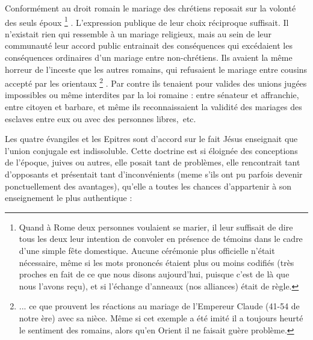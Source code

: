  Conformément au droit romain le mariage des chrétiens reposait sur la volonté des seuls époux
\footnote{Quand à Rome deux personnes voulaient se marier, il leur suffisait de dire tous les deux leur intention de convoler en présence de témoins dans le cadre d'une simple fête domestique. Aucune cérémonie plus officielle n'était nécessaire, même si les mots prononcés étaient plus ou moins codifiés (très proches en fait de ce que nous disons aujourd'hui, puisque c'est de là que nous l'avons reçu), et si l'échange d'anneaux (nos alliances) était de règle.}%
. L'expression publique de leur choix réciproque suffisait. Il n'existait rien qui ressemble à un mariage religieux, mais au sein de leur communauté leur accord public entrainait des conséquences qui excédaient les conséquences ordinaires d'un mariage entre non-chrétiens. Ils avaient la même horreur de l'inceste que les autres romains, qui refusaient le mariage entre cousins accepté par les orientaux
\footnote{... ce que prouvent les réactions au mariage de l'Empereur Claude (41-54 de notre ère) avec sa nièce. Même si cet exemple a été imité il a toujours heurté le sentiment des romains, alors qu'en Orient il ne faisait guère problème.}
. Par contre ils tenaient pour valides des unions jugées impossibles ou même interdites par la loi romaine : entre sénateur et affranchie, entre citoyen et barbare, et même ils reconnaissaient la validité des mariages des esclaves entre eux ou avec des personnes libres,~etc.

Les quatre évangiles et les Epitres sont d'accord sur le fait Jésus enseignait que l'union conjugale est indissoluble. Cette doctrine est si éloignée des conceptions de l'époque, juives ou autres, elle posait tant de problèmes, elle rencontrait tant d'opposants et présentait tant d'inconvénients (meme s'ils ont pu parfois devenir ponctuellement des avantages), qu'elle a toutes les chances d'appartenir à son enseignement le plus authentique :

